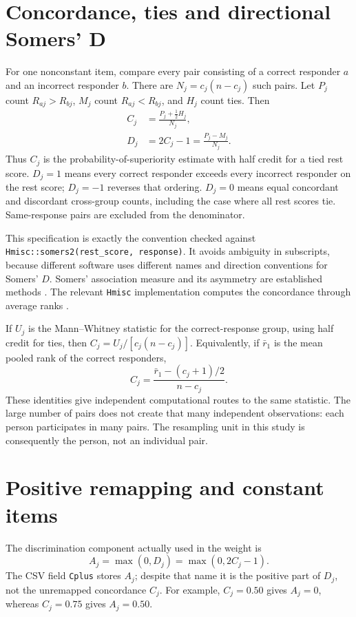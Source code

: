 \documentclass[11pt,a4paper,oneside,headings=normal,parskip=half]{scrreprt}
\newcommand{\code}[1]{\nolinkurl{#1}}
\begin{document}
\section{Concordance, ties and directional Somers' D}
For one nonconstant item, compare every pair consisting of a correct responder $a$ and an incorrect responder $b$. There are $N_j=c_j(n-c_j)$ such pairs. Let $P_j$ count $R_{aj}>R_{bj}$, $M_j$ count $R_{aj}<R_{bj}$, and $H_j$ count ties. Then
\begin{align}
C_j&=\frac{P_j+\tfrac12H_j}{N_j},\label{eq:C}\\
D_j&=2C_j-1=\frac{P_j-M_j}{N_j}.\label{eq:D}
\end{align}
Thus $C_j$ is the probability-of-superiority estimate with half credit for a tied rest score. $D_j=1$ means every correct responder exceeds every incorrect responder on the rest score; $D_j=-1$ reverses that ordering. $D_j=0$ means equal concordant and discordant cross-group counts, including the case where all rest scores tie. Same-response pairs are excluded from the denominator.

This specification is exactly the convention checked against \code{Hmisc::somers2(rest_score, response)}. It avoids ambiguity in subscripts, because different software uses different names and direction conventions for Somers' $D$. Somers' association measure and its asymmetry are established methods \citep{somers,scipysomers}. The relevant \code{Hmisc} implementation computes the concordance through average ranks \citep{hmisc}.

If $U_j$ is the Mann--Whitney statistic for the correct-response group, using half credit for ties, then $C_j=U_j/[c_j(n-c_j)]$. Equivalently, if $\bar r_1$ is the mean pooled rank of the correct responders,
\begin{equation}
 C_j=\frac{\bar r_1-(c_j+1)/2}{n-c_j}.
\end{equation}
These identities give independent computational routes to the same statistic. The large number of pairs does not create that many independent observations: each person participates in many pairs. The resampling unit in this study is consequently the person, not an individual pair.

\section{Positive remapping and constant items}
The discrimination component actually used in the weight is
\begin{equation}
 A_j=\max(0,D_j)=\max(0,2C_j-1).\label{eq:A}
\end{equation}
The CSV field \code{Cplus} stores $A_j$; despite that name it is the positive part of $D_j$, not the unremapped concordance $C_j$. For example, $C_j=0.50$ gives $A_j=0$, whereas $C_j=0.75$ gives $A_j=0.50$.
\end{document}
